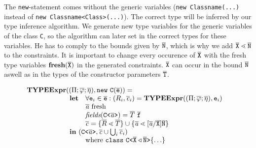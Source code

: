 \documentclass[a4paper,USenglish,cleveref, autoref, thm-restate]{lipics-v2021}
\begin{document}
The \texttt{new}-statement comes without the generic variables
(\texttt{new Classname(...)} instead of \texttt{new Classname<Class>(...)}).
The correct type will be inferred by our type inference algorithm.
We generate new type variables for the generic variables of the class \texttt{C},
so the \unify{} algorithm can later set in the correct types for these variables.
He has to comply to the bounds given by $\overline{\tt N}$, which is why we add $\overline{\tt X} \lessdot \overline{\tt N}$ to the constraints.
It is important to change every occurence of $\overline{\tt X}$ with the fresh type variables $\textbf{fresh}(\overline{\tt X})$ in the generated constraints.
$\overline{\tt X}$ can occur in the bound $\overline{\tt N}$ aswell as in the types of the constructor parameters $\overline{\tt T}$.


\begin{gather*}
  \begin{array}{@{}l@{}l}
    \typeExpr &(({\mtypeEnvironment} ; \overline{\fieldAssumption};
                \overline{\localVarAssumption}), \mathtt{new }\ \texttt{C}(\ol{e}) ) = \\
              &\begin{array}{ll}
                 \textbf{let} %
                 & \forall \texttt{e}_i \in \overline{\texttt{e}} : (R_i, \consSet_i) = \typeExpr(({\mtypeEnvironment} ; \overline{\fieldAssumption};
                   \overline{\localVarAssumption}), \texttt{e}_i)  \\
                 & \overline{\tv{a}} \text{ fresh} \\
                 & \textit{fields} (\exptype{C}{\overline{\tv{a}}}) = \overline{T}\ \ol{f} \\
                 & \consSet = \set{\overline{R} \lessdot \overline{T}}  \cup \set{\overline{\tv{a}} \lessdot [\overline{\tv{a}}/\ol{X}]\ol{N}}  \\
                 \multicolumn{2}{l}{\mathbf{in}\ (\exptype{C}{\ol{\tv{a}}}, \consSet \cup \bigcup_i \consSet_i) }\\
                 & \text{where}\ \texttt{class}\ \exptype{C}{\ol{X} \triangleleft \ol{N}} \set{\ldots} \\
               \end{array}
  \end{array}
\end{gather*}
\end{document}
